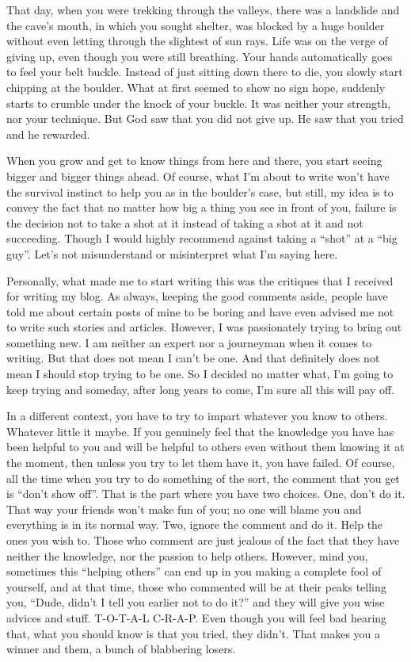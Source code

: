 \documentclass[twoside,11pt]{article}
\begin{document}
That day, when you were trekking through the valleys, there was a landslide and the cave's mouth, in which you sought shelter, was blocked by a huge boulder without even letting through the slightest of sun rays. Life was on the verge of giving up, even though you were still breathing. Your hands automatically goes to feel your belt buckle. Instead of just sitting down there to die, you slowly start chipping at the boulder. What at first seemed to show no sign hope, suddenly starts to crumble under the knock of your buckle. It was neither your strength, nor your technique. But God saw that you did not give up. He saw that you tried and he rewarded.

When you grow and get to know things from here and there, you start seeing bigger and bigger things ahead. Of course, what I'm about to write won't have the survival instinct to help you as in the boulder's case, but still, my idea is to convey the fact that no matter how big a thing you see in front of you, failure is the decision not to take a shot at it instead of taking a shot at it and not succeeding. Though I would highly recommend against taking a ``shot'' at a ``big guy''. Let's not misunderstand or misinterpret what I'm saying here.

Personally, what made me to start writing this was the critiques that I received for writing my blog. As always, keeping the good comments aside, people have told me about certain posts of mine to be boring and have even advised me not to write such stories and articles. However, I was passionately trying to bring out something new. I am neither an expert nor a journeyman when it comes to writing. But that does not mean I can't be one. And that definitely does not mean I should stop trying to be one. So I decided no matter what, I'm going to keep trying and someday, after long years to come, I'm sure all this will pay off.

In a different context, you have to try to impart whatever you know to others. Whatever little it maybe. If you genuinely feel that the knowledge you have has been helpful to you and will be helpful to others even without them knowing it at the moment, then unless you try to let them have it, you have failed. Of course, all the time when you try to do something of the sort, the comment that you get is ``don’t show off''. That is the part where you have two choices. One, don't do it. That way your friends won't make fun of you; no one will blame you and everything is in its normal way. Two, ignore the comment and do it. Help the ones you wish to. Those who comment are just jealous of the fact that they have neither the knowledge, nor the passion to help others. However, mind you, sometimes this ``helping others'' can end up in you making a complete fool of yourself, and at that time, those who commented will be at their peaks telling you, ``Dude, didn't I tell you earlier not to do it?'' and they will give you wise advices and stuff. T-O-T-A-L C-R-A-P. Even though you will feel bad hearing that, what you should know is that you tried, they didn't. That makes you a winner and them, a bunch of blabbering losers.
\end{document}
